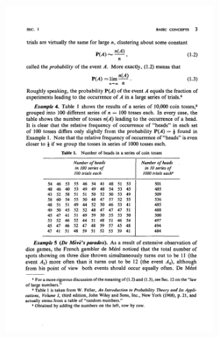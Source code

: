 \documentclass[notes=show]{beamer}\usepackage[]{graphicx}\usepackage[]{color}
\begin{document}
\begin{frame}{\secname}
\begin{example}[cont'd]

\begin{figure}[h!]
\centering
\includegraphics[width=0.7\textwidth,height=0.7\textheight]{img/roz.pdf}
\end{figure}
\end{example}
\end{frame}
%
%
%
%
%
%
\end{document}
